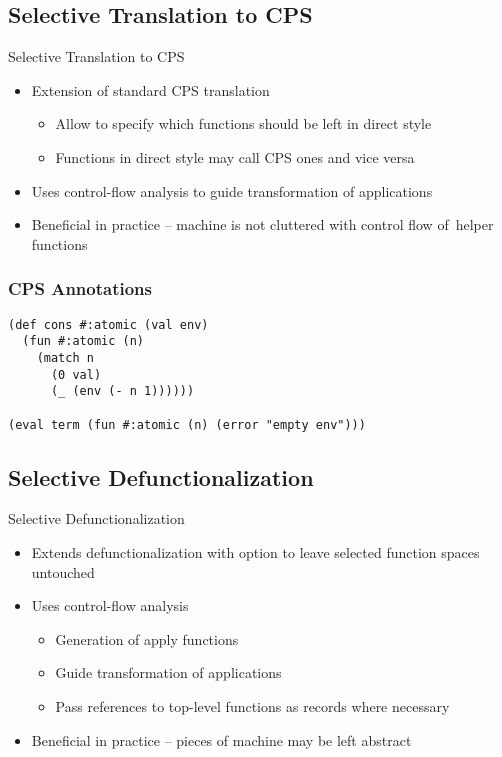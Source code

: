 \documentclass{beamer}
\begin{document}
\subsection{Selective Translation to CPS}

\begin{frame}{Selective Translation to CPS}
  \begin{itemize}
    \item Extension of standard CPS translation
    \begin{itemize}
      \item Allow to specify which functions should be left in direct style
      \item Functions in direct style may call CPS ones and vice versa
    \end{itemize}
    \item Uses control-flow analysis to guide transformation of applications
    \item Beneficial in practice -- machine is not cluttered with control flow of~helper functions
  \end{itemize}
\end{frame}

\begin{frame}[fragile]
  \frametitle{CPS Annotations}
  \begin{lstlisting}
(def cons #:atomic (val env)
  (fun #:atomic (n)
    (match n
      (0 val)
      (_ (env (- n 1))))))

(eval term (fun #:atomic (n) (error "empty env")))
  \end{lstlisting}
\end{frame}


\subsection{Selective Defunctionalization}

\begin{frame}{Selective Defunctionalization}
  \begin{itemize}
    \item Extends defunctionalization with option to leave selected function spaces untouched
    \item Uses control-flow analysis
    \begin{itemize}
      \item Generation of apply functions
      \item Guide transformation of applications
      \item Pass references to top-level functions as records where necessary
    \end{itemize}
    \item Beneficial in practice -- pieces of machine may be left abstract
  \end{itemize}
\end{frame}
\end{document}
